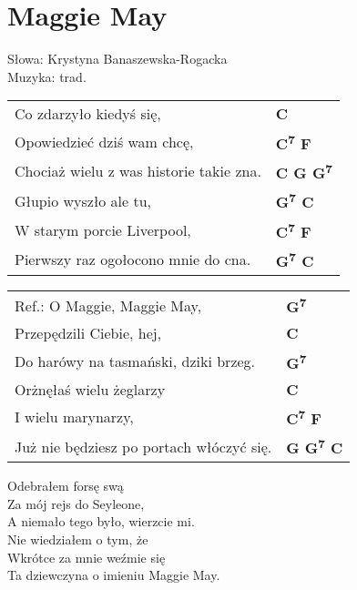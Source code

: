 \section{Maggie May}

Słowa: Krystyna Banaszewska-Rogacka\\
Muzyka:  trad.

\vspace{2em}
\begin{tabular}{@{}p{9cm}@{}l@{}}
Co zdarzyło kiedyś się,  & \bfseries   C \\
Opowiedzieć dziś wam chcę,  & \bfseries   C\textsuperscript{7} F \\
Chociaż wielu z was historie takie zna.  & \bfseries   C G G\textsuperscript{7} \\
Głupio wyszło ale tu,  & \bfseries   G\textsuperscript{7} C \\
W starym porcie Liverpool,  & \bfseries   C\textsuperscript{7} F \\
Pierwszy raz ogołocono mnie do cna.  & \bfseries   G\textsuperscript{7} C \\
\end{tabular}

\vspace{1em}
\begin{tabular}{@{}p{9cm}@{}l@{}}
Ref.: O Maggie, Maggie May,  & \bfseries   G\textsuperscript{7} \\
Przepędzili Ciebie, hej,  & \bfseries   C \\
Do harówy na tasmański, dziki brzeg.  & \bfseries   G\textsuperscript{7} \\
Orżnęłaś wielu żeglarzy  & \bfseries   C \\
I wielu marynarzy,  & \bfseries   C\textsuperscript{7} F \\
Już nie będziesz po portach włóczyć się.  & \bfseries   G G\textsuperscript{7} C \\
\end{tabular}

\vspace{1em}
Odebrałem forsę swą \\
Za mój rejs do Seyleone, \\
A niemało tego było, wierzcie mi. \\
Nie wiedziałem o tym, że \\
Wkrótce za mnie weźmie się \\
Ta dziewczyna o imieniu Maggie May. \\

